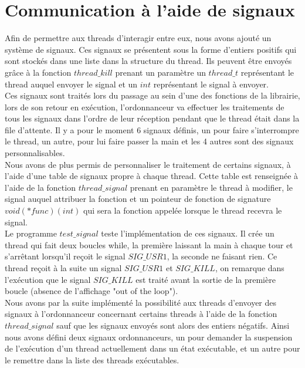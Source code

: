 \section{Communication à l'aide de signaux}
	Afin de permettre aux threads d'interagir entre eux, nous
        avons ajouté un système de signaux.  Ces signaux se
        présentent sous la forme d'entiers positifs qui sont stockés
        dans une liste dans la structure du thread. Ils peuvent être
        envoyés grâce à la fonction $thread\_kill$ prenant un
        paramètre un $thread\_t$ représentant le thread auquel envoyer
        le signal et un $int$ représentant le signal à envoyer.\\
	
	Ces signaux sont traités lors du passage au sein d'une des
        fonctions de la librairie, lors de son retour en exécution,
        l'ordonnanceur va effectuer les traitements de tous les
        signaux dans l'ordre de leur réception pendant que le thread
        était dans la file d'attente. Il y a pour le moment 6 signaux
        définis, un pour faire s'interrompre le thread, un autre, pour
        lui faire passer la main et les 4 autres sont des signaux
        personnalisables.\\
	
	Nous avons de plus permis de personnaliser le traitement de
        certains signaux, à l'aide d'une table de signaux propre à
        chaque thread. Cette table est renseignée à l'aide de la
        fonction $thread\_signal$ prenant en paramètre le thread à
        modifier, le signal auquel attribuer la fonction et un
        pointeur de fonction de signature $void(*func)(int)$ qui sera
        la fonction appelée lorsque le thread recevra le signal.\\
	
	Le programme $test\_signal$ teste l'implémentation de ces
        signaux. Il crée un thread qui fait deux boucles while, la
        première laissant la main à chaque tour et s'arrêtant
        lorsqu'il reçoit le signal $SIG\_USR1$, la seconde ne faisant
        rien. Ce thread reçoit à la suite un signal $SIG\_USR1$ et
        $SIG\_KILL$, on remarque dans l'exécution que le signal
        $SIG\_KILL$ est traité avant la sortie de la première boucle
        (absence de l'affichage "out of the loop").\\


	Nous avons par la suite implémenté la possibilité aux threads
        d'envoyer des signaux à l'ordonnanceur concernant certains
        threads à l'aide de la fonction $thread\_signal$ sauf que les
        signaux envoyés sont alors des entiers négatifs. Ainsi nous
        avons défini deux signaux ordonnanceurs, un pour demander la
        suspension de l'exécution d'un thread actuellement dans un
        état exécutable, et un autre pour le remettre dans la liste
        des threads exécutables.\\
	
